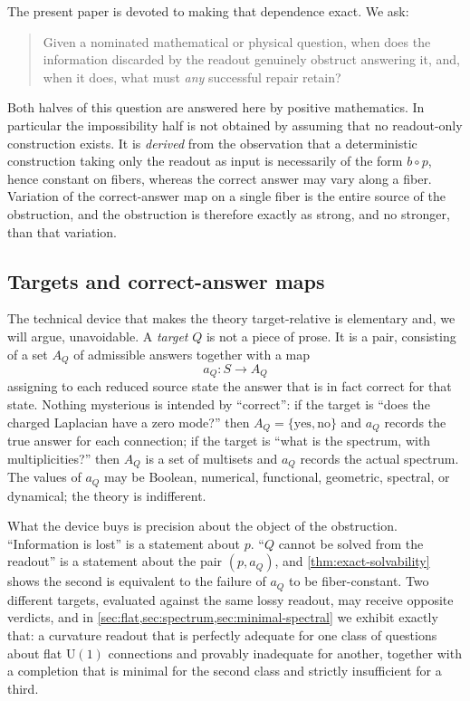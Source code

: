\documentclass[11pt,reqno]{amsart}
\theoremstyle{plain}
\theoremstyle{definition}
\newcommand{\Uone}{\mathrm{U}(1)}
\newcommand{\Src}{S}
\begin{document}
The present paper is devoted to making that dependence exact. We ask:

\begin{quote}
Given a nominated mathematical or physical question, when does the information discarded by the
readout genuinely obstruct answering it, and, when it does, what must \emph{any} successful
repair retain?
\end{quote}

Both halves of this question are answered here by positive mathematics. In particular the
impossibility half is not obtained by assuming that no readout-only construction exists. It is
\emph{derived} from the observation that a deterministic construction taking only the readout as
input is necessarily of the form $b\circ p$, hence constant on fibers, whereas the correct answer
may vary along a fiber. Variation of the correct-answer map on a single fiber is the entire
source of the obstruction, and the obstruction is therefore exactly as strong, and no stronger,
than that variation.

\subsection{Targets and correct-answer maps}

The technical device that makes the theory target-relative is elementary and, we will argue,
unavoidable. A \emph{target} $Q$ is not a piece of prose. It is a pair, consisting of a set
$A_Q$ of admissible answers together with a map
\begin{equation}\label{eq:answermap-intro}
a_Q\colon\Src\longrightarrow A_Q
\end{equation}
assigning to each reduced source state the answer that is in fact correct for that state. Nothing
mysterious is intended by ``correct'': if the target is ``does the charged Laplacian have a zero
mode?'' then $A_Q=\{\text{yes},\text{no}\}$ and $a_Q$ records the true answer for each
connection; if the target is ``what is the spectrum, with multiplicities?'' then $A_Q$ is a set
of multisets and $a_Q$ records the actual spectrum. The values of $a_Q$ may be Boolean,
numerical, functional, geometric, spectral, or dynamical; the theory is indifferent.

What the device buys is precision about the object of the obstruction. ``Information is lost''
is a statement about $p$. ``$Q$ cannot be solved from the readout'' is a statement about the
pair $(p,a_Q)$, and \cref{thm:exact-solvability} shows the second is equivalent to the failure
of $a_Q$ to be fiber-constant. Two different targets, evaluated against the same lossy readout,
may receive opposite verdicts, and in \cref{sec:flat,sec:spectrum,sec:minimal-spectral} we
exhibit exactly that: a curvature readout that is perfectly adequate for one class of questions
about flat $\Uone$ connections and provably inadequate for another, together with a completion
that is minimal for the second class and strictly insufficient for a third.
\end{document}
